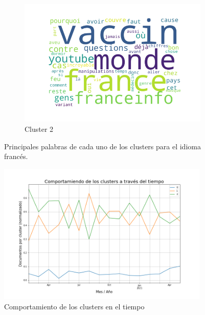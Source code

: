 \begin{figure}
\begin{subfigure}[b]{0.49\textwidth}
        \includegraphics[width=\textwidth]{results/TopicDetection/fr/cluster3_2.png}
        \caption{Cluster 2}
        \label{fig:fr_c2}
    \end{subfigure}
    \hfill
    \caption{Principales palabras de cada uno de los clusters para el idioma francés.}
    \label{fig:fr_clusters}
\end{figure}

\begin{figure}
    \centering
    \includegraphics[width=0.9\textwidth]{results/TopicDetection/fr/cluster_over_time_3.png}
    \caption{Comportamiento de los clusters en el tiempo}
    \label{fig:fr_time}
\end{figure}

